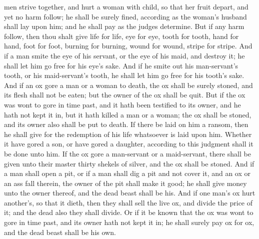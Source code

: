 men strive together, and hurt a woman with child, so that her fruit depart, and yet no harm follow; he shall be surely fined, according as the woman’s husband shall lay upon him; and he shall pay as the judges determine. But if any harm follow, then thou shalt give life for life, eye for eye, tooth for tooth, hand for hand, foot for foot, burning for burning, wound for wound, stripe for stripe.  And if a man smite the eye of his servant, or the eye of his maid, and destroy it; he shall let him go free for his eye’s sake. And if he smite out his man-servant’s tooth, or his maid-servant’s tooth, he shall let him go free for his tooth’s sake.  And if an ox gore a man or a woman to death, the ox shall be surely stoned, and its flesh shall not be eaten; but the owner of the ox shall be quit. But if the ox was wont to gore in time past, and it hath been testified to its owner, and he hath not kept it in, but it hath killed a man or a woman; the ox shall be stoned, and its owner also shall be put to death. If there be laid on him a ransom, then he shall give for the redemption of his life whatsoever is laid upon him. Whether it have gored a son, or have gored a daughter, according to this judgment shall it be done unto him. If the ox gore a man-servant or a maid-servant, there shall be given unto their master thirty shekels of silver, and the ox shall be stoned.  And if a man shall open a pit, or if a man shall dig a pit and not cover it, and an ox or an ass fall therein, the owner of the pit shall make it good; he shall give money unto the owner thereof, and the dead beast shall be his.  And if one man’s ox hurt another’s, so that it dieth, then they shall sell the live ox, and divide the price of it; and the dead also they shall divide. Or if it be known that the ox was wont to gore in time past, and its owner hath not kept it in; he shall surely pay ox for ox, and the dead beast shall be his own. 

